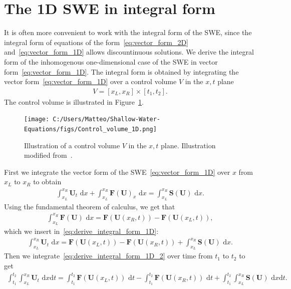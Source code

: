 \section{The 1D SWE in integral form}
It is often more convenient to work with the integral form of the SWE, since the integral form of equations of the form~\eqref{eq:vector_form_2D} and~\eqref{eq:vector_form_1D} allows discountinuous solutions.
We derive the integral form of the inhomogenous one-dimensional case of the SWE in vector form~\eqref{eq:vector_form_1D}.
The integral form is obtained by integrating the vector form~\eqref{eq:vector_form_1D} over a control volume $V$ in the $x,t$ plane
\begin{align*}
    V = [x_L, x_R] \times [t_1, t_2].
\end{align*}
The control volume is illustrated in Figure~\ref{fig:control_volume_1D}.
\begin{figure}[H]
    \centering
    \texttt{[image: C:/Users/Matteo/Shallow-Water-Equations/figs/Control\_volume\_1D.png]}
    \caption{Illustration of a control volume $V$ in the $x,t$ plane. Illustration modified from~\cite{Toro2024}.}\label{fig:control_volume_1D}
\end{figure}
First we integrate the vector form of the SWE~\eqref{eq:vector_form_1D} over $x$ from $x_L$ to $x_R$ to obtain
\begin{align}\label{eq:derive_integral_form_1D}
    \int_{x_L}^{x_R} \mathbf{U}_t \text{ d}x + \int_{x_L}^{x_R} \mathbf{F(U)}_x \text{ d}x = \int_{x_L}^{x_R} \mathbf{S(U)} \text{ d}x.
\end{align}
Using the fundamental theorem of calculus, we get that 
\begin{align*}
    \int_{x_L}^{x_R} \mathbf{F}(\mathbf{U}) \text{ d}x = \mathbf{F}(\mathbf{U}(x_R, t)) - \mathbf{F}(\mathbf{U}(x_L, t)),
\end{align*}
which we insert in~\eqref{eq:derive_integral_form_1D}:
\begin{align}\label{eq:derive_integral_form_1D_2}
    \int_{x_L}^{x_R} \mathbf{U}_t \text{ d}x = \mathbf{F}(\mathbf{U}(x_L, t)) - \mathbf{F}(\mathbf{U}(x_R, t)) + \int_{x_L}^{x_R} \mathbf{S(U)} \text{ d}x.
\end{align}
Then we integrate~\eqref{eq:derive_integral_form_1D_2} over time from $t_1$ to $t_2$ to get
\begin{align*}
    \int_{t_1}^{t_2} \int_{x_L}^{x_R} \mathbf{U}_t \text{ d}x \text{d}t = \int_{t_1}^{t_2} \mathbf{F}(\mathbf{U}(x_L, t)) \text{ d}t - \int_{t_1}^{t_2} \mathbf{F}(\mathbf{U}(x_R, t)) \text{ d}t + \int_{t_1}^{t_2} \int_{x_L}^{x_R} \mathbf{S(U)} \text{ d}x \text{d}t.
\end{align*}
